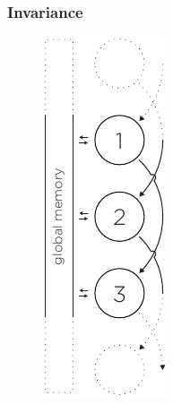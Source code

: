 \subsubsection{Invariance}


\begin{figure}
  \begin{minipage}[t]{0.20\textwidth}
    \centering
    \includegraphics[page=1, height=2\linewidth]{../resources/invariance.pdf}

\end{minipage}
\end{figure}
